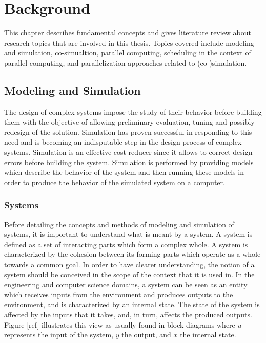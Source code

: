 \chapter{\label{ch:2-bkgnd}Background}

\minitoc

This chapter describes fundamental concepts and gives literature review about research topics that are involved in this thesis. Topics covered include modeling and simulation, co-simualtion, parallel computing, scheduling in the context of parallel computing, and parallelization approaches related to (co-)simulation. 

\section{Modeling and Simulation}

The design of complex systems impose the study of their behavior before building them with the objective of allowing preliminary evaluation, tuning and possibly redesign of the solution. Simulation has proven successful in responding to this need and is becoming an indisputable step in the design process of complex systems. Simulation is an effective cost reducer since it allows to correct design errors before building the system. Simulation is performed by providing models which describe the behavior of the system and then running these models in order to produce the behavior of the simulated system on a computer.   

\subsection{Systems}

Before detailing the concepts and methods of modeling and simulation of systems, it is important to understand what is meant by a system. A system is defined as a set of interacting parts which form a complex whole. A system is characterized by the cohesion between its forming parts which operate as a whole towards a common goal. In order to have clearer understanding, the notion of a system should be conceived in the scope of the context that it is used in. In the engineering and computer science domains, a system can be seen as an entity which receives inputs from the environment and produces outputs to the environment, and is characterized by an internal state. The state of the system is affected by the inputs that it takes, and, in turn, affects the produced outputs. Figure [ref] illustrates this view as usually found in block diagrams where $u$ represents the input of the system, $y$ the output, and $x$ the internal state.

